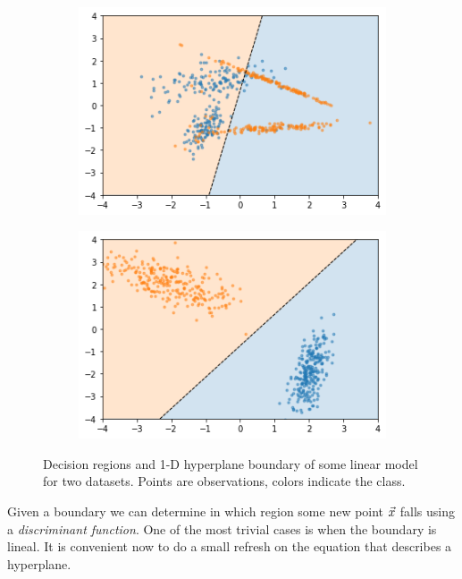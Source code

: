 \begin{figure}[H]
    \centering
    \begin{subfigure}[b]{0.4\linewidth}
        \includegraphics[width=\linewidth]{img/ch4/nolinsep.png}
    \end{subfigure}
    \begin{subfigure}[b]{0.4\linewidth}
        \includegraphics[width=\linewidth]{img/ch4/linsep.png}
    \end{subfigure}
    \caption{Decision regions and 1-D hyperplane boundary of some linear model for two datasets. Points are observations, colors indicate the class.}
    \label{fig:ch4.sep}
\end{figure}

Given a boundary we can determine in which region some new point $\vec{x}$ falls using a \emph{discriminant function}. One of the most trivial cases is when the boundary is lineal. It is convenient now to do a small refresh on the equation that describes a hyperplane.

